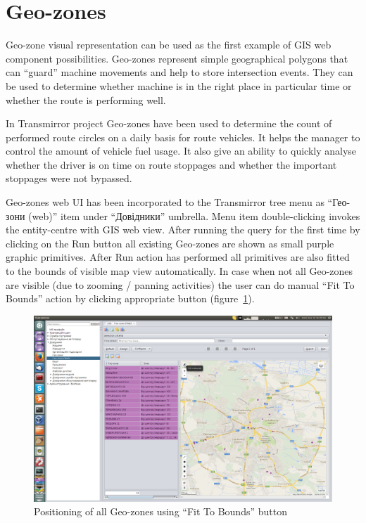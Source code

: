 \section{Geo-zones}
Geo-zone visual representation can be used as the first example of GIS web component possibilities. Geo-zones represent simple geographical polygons that can ``guard'' machine movements and help to store intersection events. They can be used to determine whether machine is in the right place in particular time or whether the route is performing well.

In Transmirror project Geo-zones have been used to determine the count of performed route circles on a daily basis for route vehicles. It helps the manager to control the amount of vehicle fuel usage. It also give an ability to quickly analyse whether the driver is on time on route stoppages and whether the important stoppages were not bypassed.

Geo-zones web UI has been incorporated to the Transmirror tree menu as ``Гео-зони (web)'' item under ``Довідники'' umbrella. Menu item double-clicking invokes the entity-centre with GIS web view. After running the query for the first time by clicking on the Run button all existing Geo-zones are shown as small purple graphic primitives. After Run action has performed all primitives are also fitted to the bounds of visible map view automatically. In case when not all Geo-zones are visible (due to zooming / panning activities) the user can do manual ``Fit To Bounds'' action by clicking appropriate button (figure~\ref{fig:01}).

\begin{figure}[H]
\centering
\includegraphics[width=\linewidth]{chapters/01-geozones/images/01-all-geo-zones-using-fit-to-bounds-button.png}
\caption{Positioning of all Geo-zones using ``Fit To Bounds'' button}\label{fig:01}
\end{figure}

